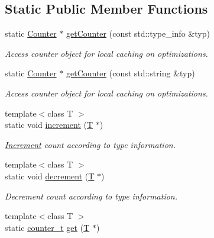 \subsection*{Static Public Member Functions}
\begin{DoxyCompactItemize}
\item 
static \hyperlink{class_d_d4hep_1_1_instance_count_1_1_counter}{Counter} $\ast$ \hyperlink{struct_d_d4hep_1_1_instance_count_a439db48975fe6b4e193a7ff40bc96bc6}{getCounter} (const std::type\_\-info \&typ)
\begin{DoxyCompactList}\small\item\em Access counter object for local caching on optimizations. \item\end{DoxyCompactList}\item 
static \hyperlink{class_d_d4hep_1_1_instance_count_1_1_counter}{Counter} $\ast$ \hyperlink{struct_d_d4hep_1_1_instance_count_ace5ceb5f2e95cb4c2a48cbd9edc3e84c}{getCounter} (const std::string \&typ)
\begin{DoxyCompactList}\small\item\em Access counter object for local caching on optimizations. \item\end{DoxyCompactList}\item 
{\footnotesize template$<$class T $>$ }\\static void \hyperlink{struct_d_d4hep_1_1_instance_count_aff4313ae357c0c3bcf3ce210eee4c470}{increment} (\hyperlink{class_t}{T} $\ast$)
\begin{DoxyCompactList}\small\item\em \hyperlink{struct_d_d4hep_1_1_increment}{Increment} count according to type information. \item\end{DoxyCompactList}\item 
{\footnotesize template$<$class T $>$ }\\static void \hyperlink{struct_d_d4hep_1_1_instance_count_a13975237d7100dab59a87dec2f67dc73}{decrement} (\hyperlink{class_t}{T} $\ast$)
\begin{DoxyCompactList}\small\item\em Decrement count according to type information. \item\end{DoxyCompactList}\item 
{\footnotesize template$<$class T $>$ }\\static \hyperlink{struct_d_d4hep_1_1_instance_count_ae81dc0c76b135425e14b6dc38262a727}{counter\_\-t} \hyperlink{struct_d_d4hep_1_1_instance_count_afe779df8d58ccb3292c1011b869608bd}{get} (\hyperlink{class_t}{T} $\ast$)

\end{DoxyCompactItemize}
